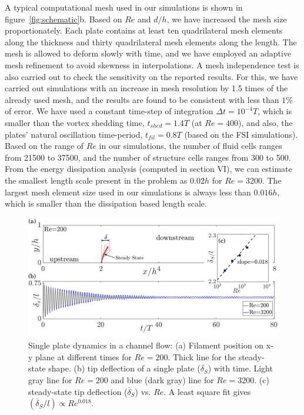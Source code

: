 \documentclass[aps,pre,twocolumn,aps,longbibliography]{revtex4-1}
\begin{document}
	
	A typical computational mesh used in our simulations is shown in figure~\ref{fig:schematic}b. Based on $Re$ and $d/h$, we have increased the mesh size proportionately. Each plate contains at least ten quadrilateral mesh elements along the thickness and thirty quadrilateral mesh elements along the length. The mesh is allowed to deform slowly with time, and we have employed an adaptive mesh refinement to avoid skewness in interpolations. A mesh independence test is also carried out to check the sensitivity on the reported results. For this, we have carried out simulations with an increase in mesh resolution by 1.5 times of the already used mesh, and the results are found to be consistent with less than $1\%$ of error. We have used a constant time-step of integration $\Delta t = 10^{-4}T$, which is smaller than the vortex shedding time, $t_{shed}=1.4T$ (at $Re=400$), and also, the plates' natural oscillation time-period, $t_{fil}=0.8T$ (based on the FSI simulations). Based on the range of $Re$ in our simulations, the number of fluid cells ranges from 21500 to 37500, and the number of structure cells ranges from 300 to 500. From the energy dissipation analysis (computed in section VI), we can estimate the smallest length scale present in the problem as $0.02h$ for $Re=3200$. The largest mesh element size used in our simulations is always less than $0.016h$, which is smaller than the dissipation based length scale.
	
	\begin{figure}
		\begin{minipage}[c]{1\linewidth}
			\includegraphics[width=1\linewidth]{Fig03.pdf} 
		\end{minipage} 
		\caption{Single plate dynamics in a channel flow: (a) Filament position on x-y plane at different times for $Re=200$. Thick line for the steady-state shape. (b) tip deflection of a single plate ($\delta_S$) with time. Light gray line for $Re=200$ and blue (dark gray) line for $Re=3200$. (c) steady-state tip deflection ($\overline{\delta}_S$) vs. $Re$. A least square fit gives $(\overline{\delta}_S/l)\propto Re^{0.018}$.}
		\label{fig:Sfil_dyn}
	\end{figure} 
	
\end{document}
